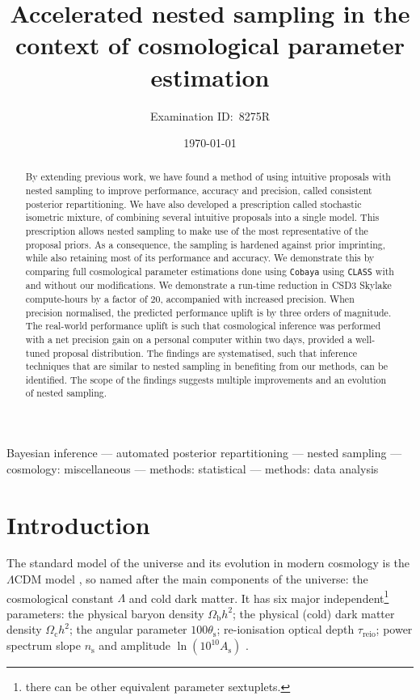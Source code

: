 \documentclass[usenatbib]{mnras}
\author[8275R]{Examination ID:~8275R}
\date{\today}
\title[Accelerated Nested Sampling]{Accelerated nested sampling in the context of cosmological parameter estimation}
\begin{document}
\maketitle
\begin{abstract}
  By extending previous work, we have found a method of using
  intuitive proposals with nested sampling to improve performance,
  accuracy and precision, called consistent posterior
  repartitioning. We have also developed a prescription called
  stochastic isometric mixture, of combining several intuitive
  proposals into a single model. This prescription allows nested
  sampling to make use of the most representative of the proposal
  priors. As a consequence, the sampling is hardened against prior
  imprinting, while also retaining most of its performance and
  accuracy. We demonstrate this by comparing full cosmological
  parameter estimations done using \texttt{Cobaya} using
  \texttt{CLASS} with and without our modifications. We demonstrate a
  run-time reduction in CSD3 Skylake compute-hours by a factor of
  \(20\), accompanied with increased precision. When precision
  normalised, the predicted performance uplift is by three orders of
  magnitude.  The real-world performance uplift is such that
  cosmological inference was performed with a net precision gain on a
  personal computer within two days, provided a well-tuned proposal
  distribution. The findings are systematised, such that inference
  techniques that are similar to nested sampling in benefiting from
  our methods, can be identified. The scope of the findings suggests
  multiple improvements and an evolution of nested sampling. 
\end{abstract}

\begin{keywords}
Bayesian inference --- automated posterior repartitioning --- nested sampling --- cosmology: miscellaneous --- methods: statistical --- methods: data analysis
\end{keywords}

\section{Introduction}\label{sec:org14413d7}

The standard model of the universe and its evolution in modern
cosmology is the \(\Lambda\)CDM model \citep{Condon2018}, so named
after the main components of the universe: the cosmological constant
\(\Lambda\) and cold dark matter. It has six major
independent\footnote{there can be other equivalent parameter
  sextuplets. } parameters: the physical baryon density
\(\Omega_\mathrm{b}h^{2}\); the physical (cold) dark matter density
\(\Omega_\mathrm{c}h^{2}\); the angular parameter
\(100\theta_\mathrm{s}\); re-ionisation optical depth
\(\tau_\text{reio}\); power spectrum slope \(n_\mathrm{s}\) and
amplitude \(\ln (10^{10}A_\mathrm{s})\) \citep{Cosmology}.
\end{document}
